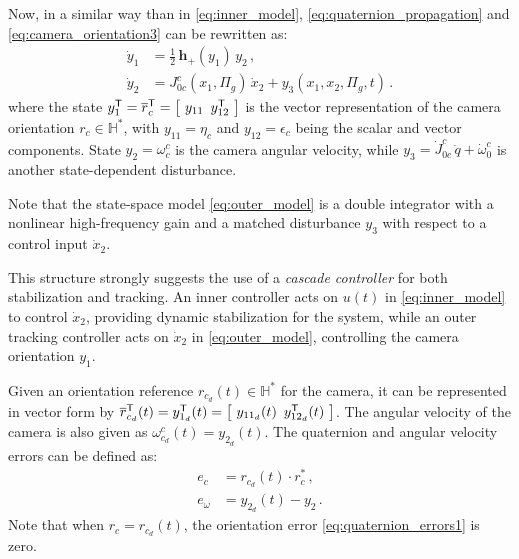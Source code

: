 Now, in a similar way than in \eqref{eq:inner_model}, \eqref{eq:quaternion_propagation} and \eqref{eq:camera_orientation3} can be rewritten as:
%
\begin{align}
\dot{y}_{1} &= \frac{1}{2} \, \mathbf{h}_+(y_1) \, y_2 \,, \nonumber \\
\dot{y}_2 &= J^{c}_{0c}(x_1,\Pi_g) \, \dot{x}_2 + y_3(x_1,x_2,\Pi_g,t) \,.
\label{eq:outer_model}
\end{align}
%
where the state $y^\mathsf{T}_1 = \overline{r}^\mathsf{T}_c = \begin{bmatrix}\,\,y_{11} \,\,\, y^\mathsf{T}_{12}\,\,\end{bmatrix}$ is the vector representation of the camera orientation $r_c \in \mathbb{H}^*$, with $y_{11} = \eta_c$ and $y_{12} = \epsilon_c$ being the scalar and vector components. 
%
State $y_2 = \omega^c_{c}$ is the camera angular velocity, while $y_3 = \dot{J}^c_{0c}\,\dot{q} + \dot{\omega}^c_{0}$ is another state-dependent disturbance.
%
\begin{remark}
\label{remark2}
Note that the state-space model \eqref{eq:outer_model} is a double integrator with a nonlinear high-frequency gain and a matched disturbance $y_3$ with respect to a control input $\dot{x}_2$.
\end{remark}

This structure strongly suggests the use of a \textit{cascade controller} for both stabilization and tracking. 
An inner controller acts on $u(t)$ in \eqref{eq:inner_model} to control $\dot{x}_2$, providing dynamic stabilization 
for the system, while an outer tracking controller acts on $\dot{x}_2$ in \eqref{eq:outer_model}, controlling the camera orientation $y_1$.

Given an orientation reference $r_{c_d}(t) \in \mathbb{H}^*$ for the camera, it can be represented in vector form by $\overline{r}^\mathsf{T}_{c_d}(t) = y^\mathsf{T}_{1_d}(t) = \begin{bmatrix}\,\,y_{11_d}(t) \,\,\, y^\mathsf{T}_{12_d}(t) \,\,\end{bmatrix}$. 
%
The angular velocity of the camera is also given as $\omega^c_{c_d}(t) = y_{2_d}(t)$. 
%
The quaternion and angular velocity errors can be defined as:
%
\begin{align}
e_{c} &= r_{c_d}(t) \cdot r^*_c \,, 
\label{eq:quaternion_errors1} \\
e_{\omega} &= y_{2_d}(t) - y_{2} \,.
\label{eq:quaternion_errors2}
\end{align}
%
Note that when $r_{c} = r_{c_d}(t)$, the orientation error \eqref{eq:quaternion_errors1} is zero.  

